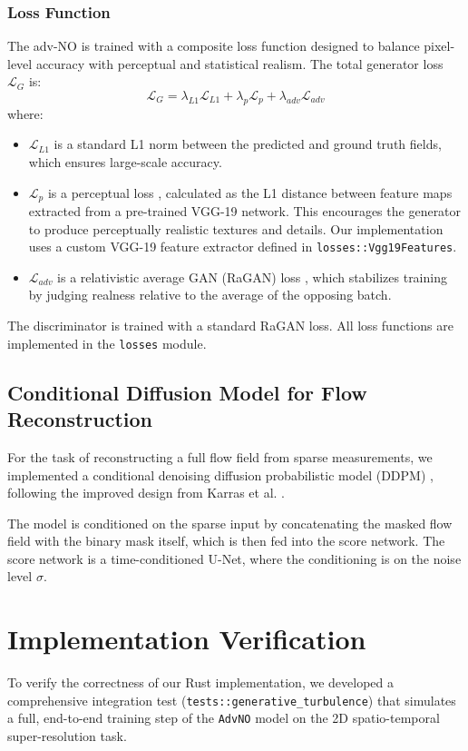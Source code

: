 \documentclass{article}
\begin{document}
\subsubsection{Loss Function}
The adv-NO is trained with a composite loss function designed to balance pixel-level accuracy with perceptual and statistical realism. The total generator loss $\mathcal{L}_G$ is:
\begin{equation}
    \mathcal{L}_G = \lambda_{L1} \mathcal{L}_{L1} + \lambda_{p} \mathcal{L}_{p} + \lambda_{adv} \mathcal{L}_{adv}
\end{equation}
where:
\begin{itemize}
    \item $\mathcal{L}_{L1}$ is a standard L1 norm between the predicted and ground truth fields, which ensures large-scale accuracy.
    \item $\mathcal{L}_{p}$ is a perceptual loss \cite{wang2018esrgan}, calculated as the L1 distance between feature maps extracted from a pre-trained VGG-19 network. This encourages the generator to produce perceptually realistic textures and details. Our implementation uses a custom VGG-19 feature extractor defined in \texttt{losses::Vgg19Features}.
    \item $\mathcal{L}_{adv}$ is a relativistic average GAN (RaGAN) loss \cite{jolicoeur2018relativistic}, which stabilizes training by judging realness relative to the average of the opposing batch.
\end{itemize}
The discriminator is trained with a standard RaGAN loss. All loss functions are implemented in the \texttt{losses} module.

\subsection{Conditional Diffusion Model for Flow Reconstruction}
For the task of reconstructing a full flow field from sparse measurements, we implemented a conditional denoising diffusion probabilistic model (DDPM) \cite{ho2020denoising}, following the improved design from Karras et al. \cite{karras2022elucidating}.

The model is conditioned on the sparse input by concatenating the masked flow field with the binary mask itself, which is then fed into the score network. The score network is a time-conditioned U-Net, where the conditioning is on the noise level $\sigma$.

\section{Implementation Verification}
To verify the correctness of our Rust implementation, we developed a comprehensive integration test (\texttt{tests::generative\_turbulence}) that simulates a full, end-to-end training step of the \texttt{AdvNO} model on the 2D spatio-temporal super-resolution task.
\end{document}
